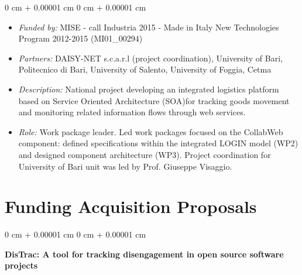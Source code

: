 \documentclass[10pt, a4paper]{article}
\newenvironment{highlights}{
    \begin{itemize}[
        topsep=0.10 cm,
        parsep=0.10 cm,
        partopsep=0pt,
        itemsep=0pt,
        leftmargin=0 cm + 10pt
    ]
}{
    \end{itemize}
} %
\newenvironment{onecolentry}{
    \begin{adjustwidth}{
        0 cm + 0.00001 cm
    }{
        0 cm + 0.00001 cm
    }
}{
    \end{adjustwidth}
} %
\begin{document}
        \vspace{0.10 cm}
        \begin{onecolentry}
            \begin{highlights}
                \item \textit{Funded by:} MISE - call Industria 2015 - Made in Italy New Technologies Program 2012-2015 (MI01\_00294)
                \item \textit{Partners:} DAISY-NET s.c.a.r.l (project coordination), University of Bari, Politecnico di Bari, University of Salento, University of Foggia, Cetma
                \item \textit{Description:} National project developing an integrated logistics platform based on Service Oriented Architecture (SOA)for tracking goods movement and monitoring related information flows through web services.
                \item \textit{Role:} Work package leader. Led work packages focused on the CollabWeb component: defined specifications within the integrated LOGIN model (WP2) and designed component architecture (WP3). Project coordination for University of Bari unit was led by Prof. Giuseppe Visaggio.
            \end{highlights}
        \end{onecolentry}



    
    \section{Funding Acquisition Proposals}



        
        \begin{onecolentry}
            \textbf{DisTrac: A tool for tracking disengagement in open source software projects}\end{onecolentry}
\end{document}
